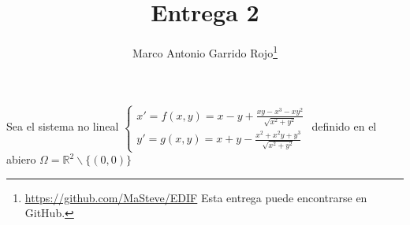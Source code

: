 \documentclass[spanish, a4paper, 12pt] {article}
\begin{document}
\title{\vspace{-1.75cm}Entrega 2}
\author{Marco Antonio Garrido Rojo\thanks{\url{https://github.com/MaSteve/EDIF} Esta entrega puede encontrarse en GitHub.}\vspace{-0.5cm}}
\date{\vspace{-0.5cm}}
\maketitle
\vspace{-0.25cm}
Sea el sistema no lineal
$\begin{cases}
    x' = f(x, y) = x - y + \frac{xy - x^3 - xy^2}{\sqrt{x^2 + y^2}} \\
    y' = g(x, y) = x + y - \frac{x^2 + x^2y + y^3}{\sqrt{x^2 + y^2}}
\end{cases}$
definido en el abiero $\Omega = \mathbb{R}^2 \backslash \{(0,0)\}$
\end{document}
